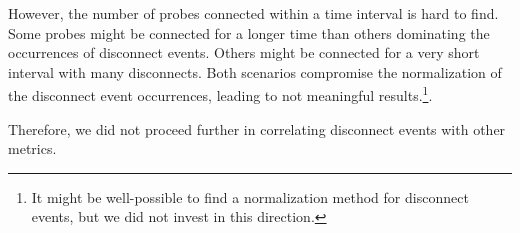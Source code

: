 However, the number of probes connected within a time interval is hard to find.
Some probes might be connected for a longer time than others dominating the
occurrences of disconnect events. Others might be connected for a very short
interval with many disconnects. Both scenarios compromise the normalization of
the disconnect event occurrences, leading to not meaningful results.\footnote{It
	might be well-possible to find a normalization method for disconnect events,
	but we did not invest in this direction.}.

Therefore, we did not proceed further in correlating disconnect events with
other metrics.
